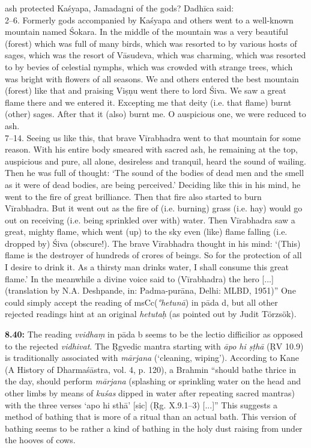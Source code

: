 \documentclass{article}
\newcommand{\vsnum}[1]{\textbf{#1}}
\newcommand{\skt}[1]{\textit{#1}}
\newcommand{\msCc}{msCc}
\begin{document}
ash protected Kaśyapa, Jamadagni of the gods? Dadhīca said:\\  2--6. Formerly gods accompanied by Kaśyapa and others went to a well-known mountain named Śokara. In the middle of the mountain was a very beautiful (forest) which was full of many birds, which was resorted to by various hosts of sages, which was the resort of Vāsudeva, which was charming, which was resorted to by bevies of celestial nymphs, which was crowded with strange trees, which was bright with flowers of all seasons. We and others entered the best mountain (forest) like that and praising Viṣṇu went there to lord Śiva. We saw a great flame there and we entered it. Excepting me that deity (i.e. that flame) burnt (other) sages. After that it (also) burnt me. O auspicious one, we were reduced to ash. \\ 7--14. Seeing us like this, that brave Vīrabhadra went to that mountain for some reason. With his entire body smeared with sacred ash, he remaining at the top, auspicious and pure, all alone, desireless and tranquil, heard the sound of wailing. Then he was full of thought: ‘The sound of the bodies of dead men and the smell as it were of dead bodies, are being perceived.’ Deciding like this in his mind, he went to the fire of great brilliance. Then that fire also started to burn Vīrabhadra. But it went out as the fire of (i.e. burning) grass (i.e. hay) would go out on receiving (i.e. being sprinkled over with) water. Then Vīrabhadra saw a great, mighty flame, which went (up) to the sky even (like) flame falling (i.e. dropped by) Śiva (obscure!). The brave Vīrabhadra thought in his mind: ‘(This) flame is the destroyer of hundreds of crores of beings. So for the protection of all I desire to drink it. As a thirsty man drinks water, I shall consume this great flame.’ In the meanwhile a divine voice said to (Vīrabhadra) the hero [...] (translation by N.A. Deshpande, in: Padma-purāna, Delhi: MLBD, 1951)''  One could simply accept the reading of \msCc (\skt{°hetunā}) in pāda d, but all other rejected readings hint at an original \skt{hetutaḥ} (as pointed out by Judit Törzsök).

\vsnum{8.40: }The reading \skt{vvidhaṃ} in pāda b seems to be the lectio difficilior as opposed to the rejected \skt{vidhivat}. The Ṛgvedic mantra starting with \skt{āpo hi ṣṭhā} (ṚV 10.9) is traditionally associated with \skt{mārjana} (`cleaning, wiping'). According to Kane (A History of Dharmaśāstra, vol. 4, p. 120), a Brahmin ``should bathe thrice in the day, should perform \skt{mārjana} (splashing or sprinkling water on the head and other limbs by means of \skt{kuśas} dipped in water after repeating sacred mantras) with the three verses `apo hi sthā' [sic] (Ṛg. X.9.1--3) [...]'' This suggests a method of bathing that is more of a ritual than an actual bath. This version of bathing seems to be rather a kind of bathing in the holy dust raising from under the hooves of cows.
\end{document}
